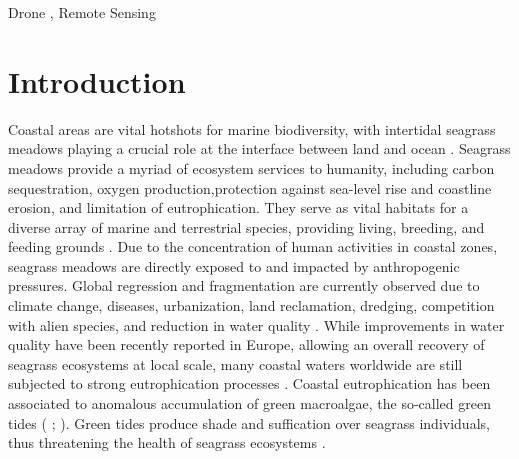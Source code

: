 \documentclass[
  number]{elsarticle}
\begin{document}
\begin{frontmatter}
\begin{keyword}
    Drone \sep 
    Remote Sensing
\end{keyword}
\end{frontmatter}
    
\section{Introduction}\label{introduction}

Coastal areas are vital hotshots for marine biodiversity, with
intertidal seagrass meadows playing a crucial role at the interface
between land and ocean \citep{unsworth2022}. Seagrass meadows provide a
myriad of ecosystem services to humanity, including carbon
sequestration, oxygen production,protection against sea-level rise and
coastline erosion, and limitation of eutrophication. They serve as vital
habitats for a diverse array of marine and terrestrial species,
providing living, breeding, and feeding grounds \citetext{\citealp[
]{gardner2018}; \citealp[ ]{Zoffoli2022}; \citealp{jankowska2019}}. Due
to the concentration of human activities in coastal zones, seagrass
meadows are directly exposed to and impacted by anthropogenic pressures.
Global regression and fragmentation are currently observed due to
climate change, diseases, urbanization, land reclamation, dredging,
competition with alien species, and reduction in water quality
\citetext{\citealp[ ]{nguyen2021}; \citealp[ ]{soissons2018}; \citealp[
]{orth2006}; \citealp[ ]{lin2018}; \citealp{duffy2019}}. While
improvements in water quality have been recently reported in Europe,
allowing an overall recovery of seagrass ecosystems at local scale, many
coastal waters worldwide are still subjected to strong eutrophication
processes \citetext{\citealp[ ]{deSantos2019}; \citealp{Zoffoli2021}}.
Coastal eutrophication has been associated to anomalous accumulation of
green macroalgae, the so-called green tides (\citep{devlin2023nutrients}
; \citep{devlin2023nutrients}). Green tides produce shade and
suffication over seagrass individuals, thus threatening the health of
seagrass ecosystems \citep{wang2022}.
\end{document}
